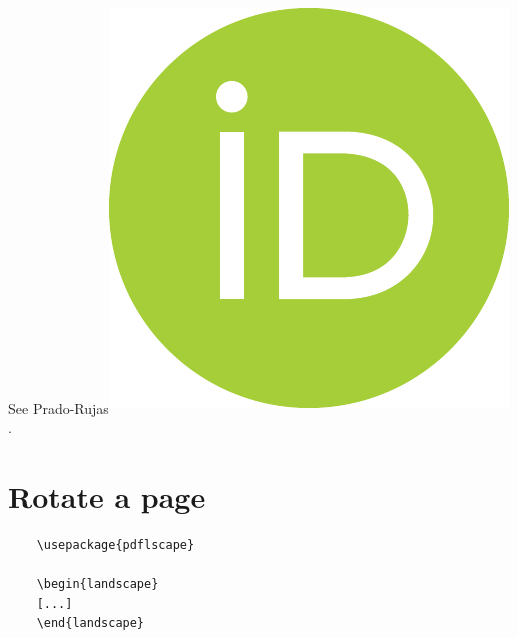 \documentclass[11pt,a4paper,english,twoside,notitlepage,openright]{article}
\newcommand{\orcid}[1]{\textsuperscript{\href{https://orcid.org/#1}{\includegraphics[scale=0.04]{00_orcid.pdf}}}}
\begin{document}
See Prado-Rujas{\orcid{0000-0003-4018-8725}}.

\section{Rotate a page}

\begin{verbatim}
	\usepackage{pdflscape}
	
	\begin{landscape}
	[...]
	\end{landscape}
\end{verbatim}
\end{document}
